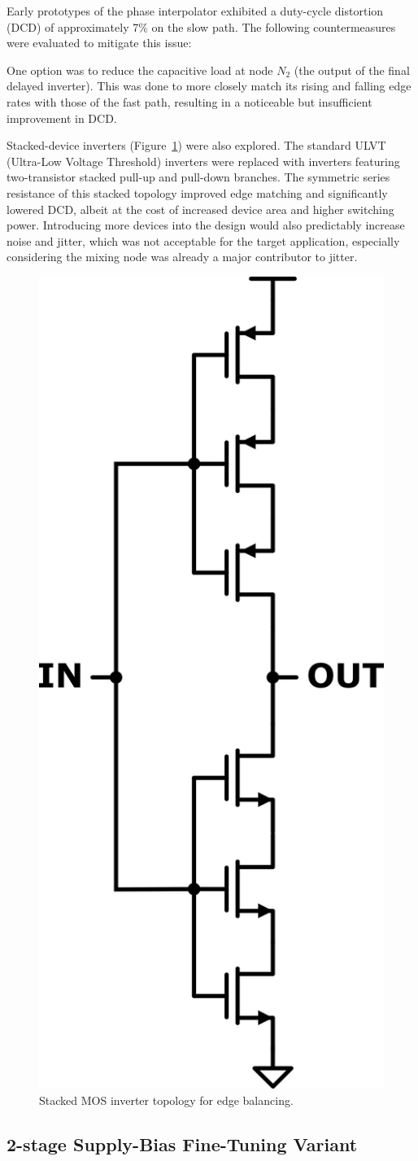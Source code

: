 Early prototypes of the phase interpolator exhibited a duty-cycle distortion (DCD) of approximately 7\% on the slow path. The following countermeasures were evaluated to mitigate this issue:

One option was to reduce the capacitive load at node $N_2$ (the output of the final delayed inverter). This was done to more closely match its rising and falling edge rates with those of the fast path, resulting in a noticeable but insufficient improvement in DCD.

Stacked-device inverters (Figure~\ref{fig:stacked_inv}) were also explored. The standard ULVT (Ultra-Low Voltage Threshold) inverters were replaced with inverters featuring two-transistor stacked pull-up and pull-down branches. The symmetric series resistance of this stacked topology improved edge matching and significantly lowered DCD, albeit at the cost of increased device area and higher switching power. Introducing more devices into the design would also predictably increase noise and jitter, which was not acceptable for the target application, especially considering the mixing node was already a major contributor to jitter.

\begin{figure}[H]
  \centering
  \includegraphics[width=0.3\linewidth, angle=90]{figures/Schematics/stacked_inverter-2.png}
  \caption{Stacked MOS inverter topology for edge balancing.}
  \label{fig:stacked_inv}
\end{figure}

\subsection{2-stage Supply-Bias Fine-Tuning Variant}\label{sec:avcc_finetune}

